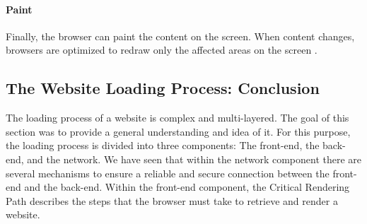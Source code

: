 \paragraph{Paint} %

Finally, the browser can paint the content on the screen.
When content changes, browsers are optimized to redraw only the affected areas on the screen \cite{2021MDNCRP}.












\subsection{The Website Loading Process: Conclusion} %

The loading process of a website is complex and multi-layered.
The goal of this section was to provide a general understanding and idea of it.
For this purpose, the loading process is divided into three components: The front-end, the back-end, and the network.
We have seen that within the network component there are several mechanisms to ensure a reliable and secure connection between the front-end and the back-end.
Within the front-end component, the Critical Rendering Path describes the steps that the browser must take to retrieve and render a website.


